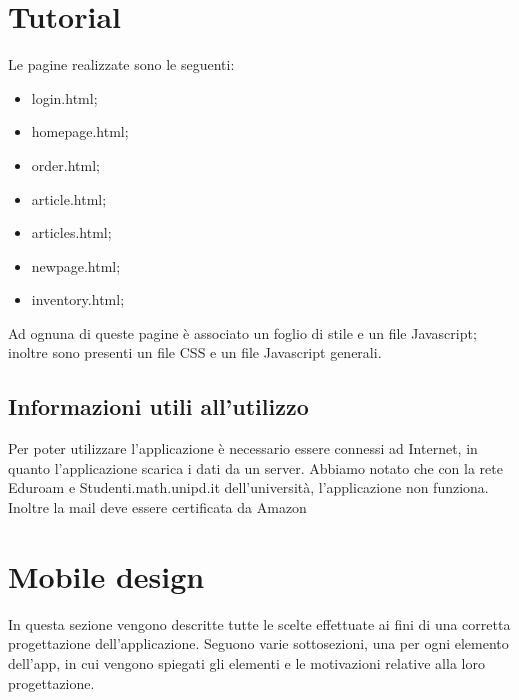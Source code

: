 \documentclass[12pt, a4paper, titlepage]{report}
\begin{document}
	\section{Tutorial}
	Le pagine realizzate sono le seguenti:
	\begin{itemize}
		\item login.html;
		\item homepage.html;
		\item order.html;
		\item article.html;
		\item articles.html;
		\item newpage.html;
		\item inventory.html;
	\end{itemize}
	Ad ognuna di queste pagine è associato un foglio di stile e un file Javascript; inoltre sono presenti un file CSS e un file Javascript generali.
	
	\subsection{Informazioni utili all'utilizzo}
	Per poter utilizzare l'applicazione è necessario essere connessi ad Internet, in quanto l'applicazione scarica i dati da un server. Abbiamo notato che con la rete Eduroam e Studenti.math.unipd.it dell'università, l'applicazione non funziona. Inoltre la mail deve essere certificata da Amazon 
	
	\section{Mobile design}
	In questa sezione vengono descritte tutte le scelte effettuate ai fini di una corretta progettazione dell'applicazione. Seguono varie sottosezioni, una per ogni elemento dell'app, in cui vengono spiegati gli elementi e le motivazioni relative alla loro progettazione.
	
\end{document}
